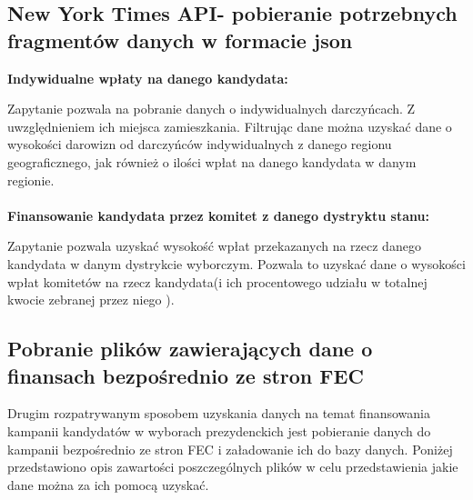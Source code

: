 \documentclass[10pt,a4paper]{article}
\begin{document}
\subsection{New York Times API- pobieranie potrzebnych fragmentów danych w formacie json}
\textbf{Indywidualne wpłaty na danego kandydata:}

Zapytanie \cite{derekwillis2015ind} pozwala na pobranie danych o indywidualnych darczyńcach. Z uwzględnieniem ich miejsca zamieszkania. Filtrując dane można uzyskać dane o wysokości darowizn od darczyńców indywidualnych  z danego regionu geograficznego,  jak również o ilości wpłat na danego kandydata w danym regionie.
\\
\\
\textbf{Finansowanie kandydata przez komitet z danego dystryktu stanu:}

Zapytanie \cite{derekwillis2015com} pozwala uzyskać wysokość wpłat przekazanych na rzecz danego kandydata w danym dystrykcie wyborczym. Pozwala to uzyskać dane o wysokości wpłat komitetów na rzecz kandydata(i ich procentowego udziału w totalnej kwocie zebranej przez niego ).

\subsection{Pobranie plików zawierających dane o finansach bezpośrednio ze stron FEC}

Drugim rozpatrywanym sposobem uzyskania danych na temat finansowania kampanii kandydatów w wyborach prezydenckich jest pobieranie danych do kampanii bezpośrednio ze stron FEC i załadowanie ich do bazy danych.
Poniżej przedstawiono opis zawartości poszczególnych plików w celu przedstawienia jakie dane można za ich pomocą uzyskać.
\end{document}
